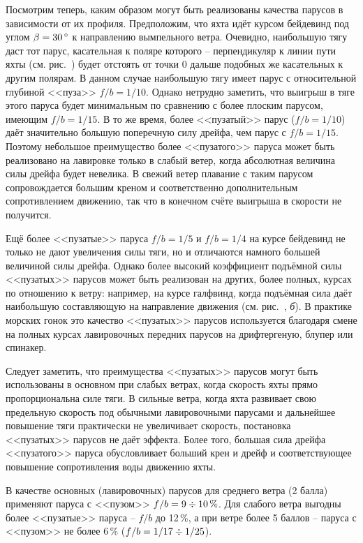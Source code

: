 Посмотрим теперь, каким образом могут быть реализованы качества
парусов в зависимости от их профиля. Предположим, что яхта идёт курсом
бейдевинд под углом $\beta = 30\,^\circ$ к направлению вымпельного
ветра. Очевидно, наибольшую тягу даст тот парус, касательная к поляре
которого \--- перпендикуляр к линии пути яхты (см. рис.~)
будет отстоять от точки 0 дальше подобных же касательных к другим
полярам. В данном случае наибольшую тягу имеет парус с относительной
глубиной <<пуза>> $f/b=1/10$. Однако нетрудно заметить, что выигрыш в
тяге этого паруса будет минимальным по сравнению с более плоским
парусом, имеющим $f/b = 1/15$. В то же время, более <<пузатый>> парус
($f/b = 1/10$) даёт значительно большую поперечную силу дрейфа, чем
парус с $f/b = 1/15$. Поэтому небольшое преимущество более
<<пузатого>> паруса может быть реализовано на лавировке только в
слабый ветер, когда абсолютная величина силы дрейфа будет невелика. В
свежий ветер плавание с таким парусом сопровождается большим креном и
соответственно дополнительным сопротивлением движению, так что в
конечном счёте выигрыша в скорости не получится.

Ещё более <<пузатые>> паруса $f/b=1/5$ и $f/b=1/4$ на курсе бейдевинд
не только не дают увеличения силы тяги, но и отличаются намного
большей величиной силы дрейфа. Однако более высокий коэффициент
подъёмной силы <<пузатых>> парусов может быть реализован на других,
более полных, курсах по отношению к ветру: например, на курсе
галфвинд, когда подъёмная сила даёт наибольшую составляющую на
направление движения (см. рис.~, \textit{б}). В практике
морских гонок это качество <<пузатых>> парусов используется благодаря
смене на полных курсах лавировочных передних парусов на дрифтергеную,
блупер или спинакер.

Следует заметить, что преимущества <<пузатых>> парусов могут быть
использованы в основном при слабых ветрах, когда скорость яхты прямо
пропорциональна силе тяги. В сильные ветра, когда яхта развивает свою
предельную скорость под обычными лавировочными парусами и дальнейшее
повышение тяги практически не увеличивает скорость, постановка
<<пузатых>> парусов не даёт эффекта. Более того, большая сила дрейфа
<<пузатого>> паруса обусловливает больший крен и дрейф и
соответствующее повышение сопротивления воды движению яхты.

В качестве основных (лавировочных) парусов для среднего ветра (2 балла) применяют паруса с <<пузом>> $f/b=9\div 10\,\%$. Для
слабого ветра выгодны более <<пузатые>> паруса \--- $f/b$ до 12\,\%, а
при ветре более 5 баллов \--- паруса с <<пузом>> не более 6\,\%
($f/b=1/17\div 1/25$).

